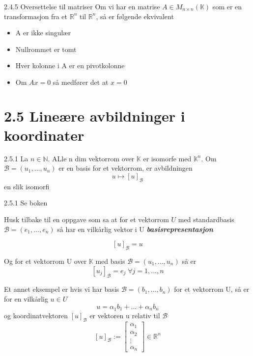 \documentclass[a4paper,norsk]{article}
\begin{document}
\begin{oppgavebox}{2.4.5}{}
Oversettelse til matriser
Om vi har en matrise $ A \in M_{n \times n} \left( \mathbb{K} \right)  $  som er en transformasjon fra et $ \mathbb{R}^n $ til $ \mathbb{R}^n $, så er følgende ekvivalent

\begin{itemize}
  \item A er ikke singulær
  \item Nullrommet er tomt
  \item Hver kolonne i A er en pivotkolonne
  \item Om $ Ax = 0 $  så medfører det at $ x=0 $ 
\end{itemize}
\end{oppgavebox}

\section*{2.5 Lineære avbildninger i koordinater}

\begin{theorembox}{2.5.1}{}
La $ n \in \mathbb{N} $. ALle n dim vektorrom over $ \mathbb{K} $ er isomorfe med $ \mathbb{K}^n $. Om $ \mathcal{B}  = \left( u_1, ..., u_n \right) $ er en basis for et vektorrom, er avbildningen
\[
    u \mapsto \left[ u \right] _{\mathcal{B}}
\]
en slik isomorfi

\begin{proofbox}{2.5.1}{}
Se boken
\end{proofbox}
\end{theorembox}

Husk tilbake til en oppgave som sa at for et vektorrom $ U $ med standardbasis $ \mathcal{B} = \left( e_1, ..., e_n \right)  $ så har en vilkårlig vektor i U \textbf{\textit{basisrepresentasjon}}

\[
    \left[ u \right] _{\mathcal{B}} = u
\]

Og for et vektorrom U over $ \mathbb{K} $ med basis $ \mathcal{B} = \left( u_1, ..., u_n \right)  $ så er
\[
    \left[ u_j \right] _{ \mathcal{B}} = e_j \; \forall j =1, ..., n
\]

Et annet eksempel er hvis vi har basis $ \mathcal{B} = \left( b_1, ..., b_n \right)  $ for et vektorrom U, så er for en vilkårlig $ u \in U $ 
\[
    u = \alpha_{1}^{} b_1 + ... + \alpha_{n}^{} b_n
\]
og koordinatvektoren $ \left[ u \right] _{\mathcal{B}} $ er vektoren u relativ til $ \mathcal{B} $   
\[
    \left[ u \right] _{\mathcal{B}} := \begin{bmatrix}
        \alpha_{1}^{} \\ \alpha_{2}^{}\\ \vdots \\ \alpha_{n}^{} 
    \end{bmatrix} \in  \mathbb{R}^n
\]
\end{document}
